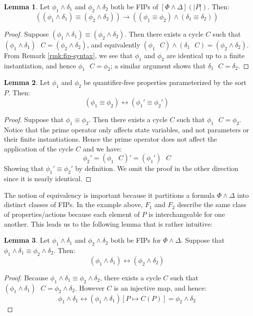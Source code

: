 \documentclass[12pt]{article}
\theoremstyle{definition}
\newtheorem{lemma}{Lemma}
\theoremstyle{remark}
\newcommand{\msp}{\text{ }}
\begin{document}
\begin{lemma}
  \label{lem:and-decomp}
  Let $\phi_1\land\delta_1$ and $\phi_2\land\delta_2$ both be FIPs of $[\Phi\land\Delta](|P|)$.  Then:
  $$((\phi_1\land\delta_1) \equiv (\phi_2\land\delta_2)) \rightarrow ((\phi_1 \equiv \phi_2) \land (\delta_1 \equiv \delta_2))$$
\end{lemma}
\begin{proof}
  Suppose $(\phi_1\land\delta_1) \equiv (\phi_2\land\delta_2)$.  Then there exists a cycle $C$ such that $(\phi_1\land\delta_1) \msp C = (\phi_2\land\delta_2)$, and equivalently $(\phi_1 \msp C) \land (\delta_1 \msp C) = (\phi_2\land\delta_2)$.  From Remark \ref{rmk:fip-syntax}, we see that $\phi_1$ and $\phi_2$ are identical up to a finite instantiation, and hence $\phi_1 \msp C = \phi_2$; a similar argument shows that $\delta_1 \msp C = \delta_2$.
\end{proof}

\begin{lemma}
  \label{lem:prime-bijec}
  Let $\phi_1$ and $\phi_2$ be quantifier-free properties parameterized by the sort $P$.  Then:
  $$(\phi_1 \equiv \phi_2) \leftrightarrow (\phi_1' \equiv \phi_2')$$
\end{lemma}
\begin{proof}
  Suppose that $\phi_1 \equiv \phi_2$.  Then there exists a cycle $C$ such that $\phi_1 \msp C = \phi_2$.  Notice that the prime operator only affects state variables, and not parameters or their finite instantiations.  Hence the prime operator does not affect the application of the cycle $C$ and we have:
  $$\phi_2' = (\phi_1 \msp C)' = (\phi_1') \msp C$$
  Showing that $\phi_1' \equiv \phi_2'$ by definition.  We omit the proof in the other direction since it is nearly identical.
\end{proof}

The notion of equivalency is important because it partitions a formula $\Phi \land \Delta$ into distinct classes of FIPs.  In the example above, $F_1$ and $F_2$ describe the same class of properties/actions because each element of $P$ is interchangeable for one another.  This leads us to the following lemma that is rather intuitive:

\begin{lemma}
  \label{lem:eqiv-bijec}
  Let $\phi_1\land\delta_1$ and $\phi_2\land\delta_2$ both be FIPs for $\Phi\land\Delta$.  Suppose that $\phi_1\land\delta_1 \equiv \phi_2\land\delta_2$.  Then:
  $$(\phi_1 \land \delta_1) \leftrightarrow (\phi_2 \land \delta_2)$$
\end{lemma}
\begin{proof}
  Because $\phi_1\land\delta_1 \equiv \phi_2\land\delta_2$, there exists a cycle $C$ such that $(\phi_1\land\delta_1) \msp C = \phi_2\land\delta_2$.  However $C$ is an injective map, and hence:
  $$\phi_1\land\delta_1 \leftrightarrow (\phi_1\land\delta_1)[P \mapsto C(P)] = \phi_2\land\delta_2$$
\end{proof}
\end{document}
